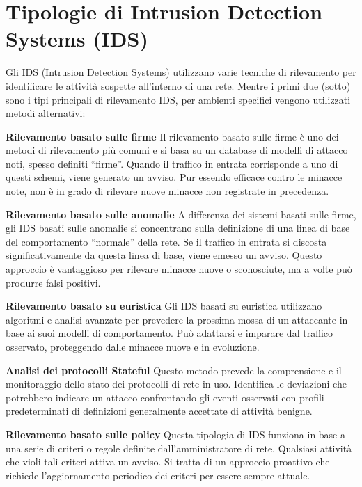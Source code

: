 \section{Tipologie di Intrusion Detection Systems (IDS)}

Gli IDS (Intrusion Detection Systems) utilizzano varie tecniche di rilevamento per identificare le attività sospette all’interno di una rete. Mentre i primi due (sotto) sono i tipi principali di rilevamento IDS, per ambienti specifici vengono utilizzati metodi alternativi:

\textbf{Rilevamento basato sulle firme}
Il rilevamento basato sulle firme è uno dei metodi di rilevamento più comuni e si basa su un database di modelli di attacco noti, spesso definiti “firme”. Quando il traffico in entrata corrisponde a uno di questi schemi, viene generato un avviso. Pur essendo efficace contro le minacce note, non è in grado di rilevare nuove minacce non registrate in precedenza.

\textbf{Rilevamento basato sulle anomalie}
A differenza dei sistemi basati sulle firme, gli IDS basati sulle anomalie si concentrano sulla definizione di una linea di base del comportamento “normale” della rete. Se il traffico in entrata si discosta significativamente da questa linea di base, viene emesso un avviso. Questo approccio è vantaggioso per rilevare minacce nuove o sconosciute, ma a volte può produrre falsi positivi.

\textbf{Rilevamento basato su euristica}
Gli IDS basati su euristica utilizzano algoritmi e analisi avanzate per prevedere la prossima mossa di un attaccante in base ai suoi modelli di comportamento. Può adattarsi e imparare dal traffico osservato, proteggendo dalle minacce nuove e in evoluzione.

\textbf{Analisi dei protocolli Stateful}
Questo metodo prevede la comprensione e il monitoraggio dello stato dei protocolli di rete in uso. Identifica le deviazioni che potrebbero indicare un attacco confrontando gli eventi osservati con profili predeterminati di definizioni generalmente accettate di attività benigne.

\textbf{Rilevamento basato sulle policy}
Questa tipologia di IDS funziona in base a una serie di criteri o regole definite dall’amministratore di rete. Qualsiasi attività che violi tali criteri attiva un avviso. Si tratta di un approccio proattivo che richiede l’aggiornamento periodico dei criteri per essere sempre attuale.

